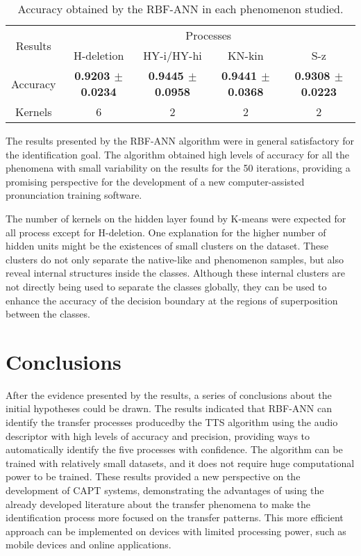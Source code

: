 \begin{table*}[h]
\caption{Accuracy obtained by the RBF-ANN in each phenomenon studied.}\label{tab-atos}
\centering
\begin{tabular}{c|cccc}
\hline
\multirow{2}{*}{Results} & \multicolumn{4}{c}{Processes} \\
\cline{2-5}  & H-deletion & HY-i/HY-hi  & KN-kin  & S-z  \\
\hline
Accuracy & \textbf{0.9203 $\pm$ 0.0234} & \textbf{0.9445 $\pm$ 0.0958} & \textbf{0.9441 $\pm$ 0.0368} & \textbf{0.9308 $\pm$ 0.0223}  \\
\hline
Kernels  & 6  & 2  & 2  & 2 \\
\hline
\end{tabular}
\end{table*}

The results presented by the RBF-ANN algorithm were in general satisfactory for
the identification goal. The algorithm obtained high levels of accuracy for all
the phenomena with small variability on the results for the 50 iterations,
providing a promising perspective for the development of a new
computer-assisted pronunciation training software.

The number of kernels on the hidden layer found by K-means were expected for
all process except for H-deletion. One explanation for the higher number of
hidden units might be the existences of small clusters on the dataset. These
clusters do not only separate the native-like and phenomenon samples, but also
reveal internal structures inside the classes. Although these internal clusters
are not directly being used to separate the classes globally, they can be used
to enhance the accuracy of the decision boundary at the regions of
superposition between the classes.

\section{Conclusions}
After the evidence presented by the results, a series of conclusions about the
initial hypotheses could be drawn. The results indicated that RBF-ANN can
identify the transfer processes producedby the TTS algorithm using the audio
descriptor with high levels of accuracy and precision, providing ways to
automatically identify the five processes with confidence. The algorithm can be
trained with relatively small datasets, and it does not require huge
computational power to be trained. These results provided a new perspective on
the development of CAPT systems, demonstrating the advantages of using the
already developed literature about the transfer phenomena to make the
identification process more focused on the transfer patterns. This more
efficient approach can be implemented on devices with limited processing power,
such as mobile devices and online applications.

